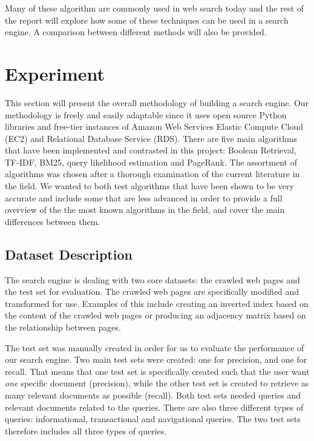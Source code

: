 Many of these algorithm are commonly used in web search today and the rest of the report will explore how some of these techniques can be used in a search engine. A comparison between different methods will also be provided.




\section{Experiment} %
\label{sec:experiment}

This section will present the overall methodology of building a search engine. Our methodology is freely and easily adaptable since it uses open source Python libraries and free-tier instances of Amazon Web Services Elastic Compute Cloud (EC2) and Relational Database Service (RDS). There are five main algorithms that have been implemented and contrasted in this project: Boolean Retrieval, TF-IDF, BM25, query likelihood estimation and PageRank. The assortment of algorithms was chosen after a thorough examination of the current literature in the field. We wanted to both test algorithms that have been shown to be very accurate and include some that are less advanced in order to provide a full overview of the the most known algorithms in the field, and cover the main differences between them. 

\subsection{Dataset Description} %
\label{sub:dataset_description}

The search engine is dealing with two core datasets: the crawled web pages and the test set for evaluation. The crawled web pages are specifically modified and transformed for use. Examples of this include creating an inverted index based on the content of the crawled web pages or producing an adjacency matrix based on the relationship between pages.

The test set was manually created in order for us to evaluate the performance of our search engine. Two main test sets were created: one for precision, and one for recall. That means that one test set is specifically created such that the user want \emph{one} specific document (precision), while the other test set is created to retrieve as many relevant documents as possible (recall). Both test sets needed queries and relevant documents related to the queries. There are also three different types of queries: informational, transactional and navigational queries. The two test sets therefore includes all three types of queries.

